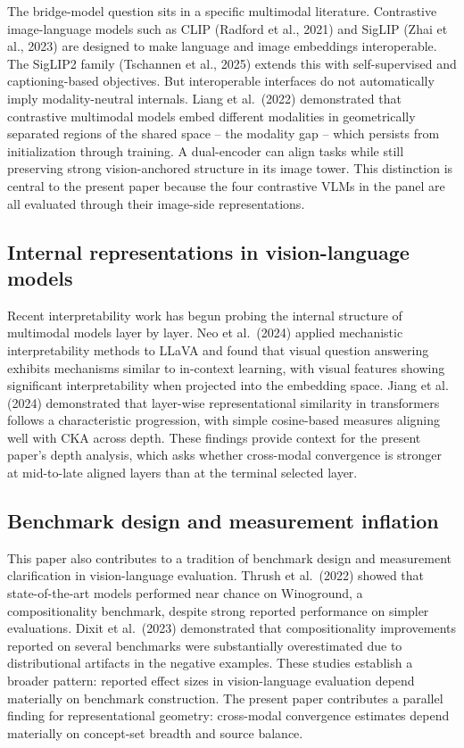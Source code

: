 \documentclass[10pt]{article}
\begin{document}
The bridge-model question sits in a specific multimodal literature.
Contrastive image-language models such as CLIP (Radford et al., 2021)
and SigLIP (Zhai et al., 2023) are designed to make language and image
embeddings interoperable. The SigLIP2 family (Tschannen et al., 2025)
extends this with self-supervised and captioning-based objectives. But
interoperable interfaces do not automatically imply modality-neutral
internals. Liang et al.~(2022) demonstrated that contrastive multimodal
models embed different modalities in geometrically separated regions of
the shared space -- the modality gap -- which persists from
initialization through training. A dual-encoder can align tasks while
still preserving strong vision-anchored structure in its image tower.
This distinction is central to the present paper because the four
contrastive VLMs in the panel are all evaluated through their image-side
representations.

\subsection{Internal representations in vision-language
models}\label{internal-representations-in-vision-language-models}

Recent interpretability work has begun probing the internal structure of
multimodal models layer by layer. Neo et al.~(2024) applied mechanistic
interpretability methods to LLaVA and found that visual question
answering exhibits mechanisms similar to in-context learning, with
visual features showing significant interpretability when projected into
the embedding space. Jiang et al. (2024) demonstrated that layer-wise
representational similarity in transformers follows a characteristic
progression, with simple cosine-based measures aligning well with CKA
across depth. These findings provide context for the present paper's
depth analysis, which asks whether cross-modal convergence is stronger
at mid-to-late aligned layers than at the terminal selected layer.

\subsection{Benchmark design and measurement
inflation}\label{benchmark-design-and-measurement-inflation}

This paper also contributes to a tradition of benchmark design and
measurement clarification in vision-language evaluation. Thrush et
al.~(2022) showed that state-of-the-art models performed near chance on
Winoground, a compositionality benchmark, despite strong reported
performance on simpler evaluations. Dixit et al.~(2023) demonstrated
that compositionality improvements reported on several benchmarks were
substantially overestimated due to distributional artifacts in the
negative examples. These studies establish a broader pattern: reported
effect sizes in vision-language evaluation depend materially on
benchmark construction. The present paper contributes a parallel finding
for representational geometry: cross-modal convergence estimates depend
materially on concept-set breadth and source balance.
\end{document}

